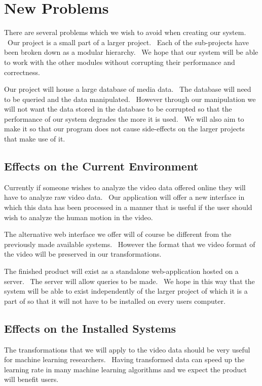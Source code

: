 \documentclass{scrreprt}
\begin{document}
\section{New Problems}

{There are several problems which we wish to avoid when creating our
system. ~Our project is a small part of a larger project. ~Each of the
sub-projects have been broken down as a modular hierarchy. ~We hope that
our system will be able to work with the other modules without
corrupting their performance and correctness.}

{Our project will house a large database of media data. ~The database
will need to be queried and the data manipulated. ~However through our
manipulation we will not want the data stored in the database to be
corrupted so that the performance of our system degrades the more it is
used. ~We will also aim to make it so that our program does not cause
side-effects on the larger projects that make use of it. ~}

\subsection{Effects on the Current Environment}

{Currently if someone wishes to analyze the video data offered online
they will have to analyze raw video data. ~Our application will offer a
new interface in which this data has been processed in a manner that is
useful if the user should wish to analyze the human motion in the
video.}

{The alternative web interface we offer will of course be different from
the previously made available systems. ~However the format that we video
format of the video will be preserved in our transformations.}

{The finished product will exist as a standalone web-application hosted
on a server. ~The server will allow queries to be made. ~We hope in this
way that the system will be able to exist independently of the larger
project of which it is a part of so that it will not have to be
installed on every users computer. }

\subsection{Effects on the Installed Systems}

{The transformations that we will apply to the video data should be very
useful for machine learning researchers. ~Having transformed data can
speed up the learning rate in many machine learning algorithms and we
expect the product will benefit users.}
\end{document}
